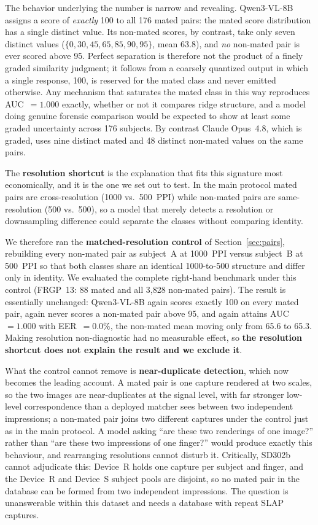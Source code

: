 \documentclass[runningheads]{llncs}
\begin{document}
The behavior underlying the number is narrow and revealing. Qwen3-VL-8B
assigns a score of \emph{exactly} 100 to all 176 mated pairs: the mated
score distribution has a single distinct value. Its non-mated scores, by
contrast, take only seven distinct values
($\{0, 30, 45, 65, 85, 90, 95\}$, mean 63.8), and \emph{no} non-mated pair
is ever scored above 95. Perfect separation is therefore not the product of a finely graded similarity
judgment; it follows from a coarsely quantized output in which a single
response, 100, is reserved for the mated class and never emitted otherwise.
Any mechanism that saturates the mated class in this way reproduces
AUC~$= 1.000$ exactly, whether or not it compares ridge structure, and a model
doing genuine forensic comparison would be expected to show at least some
graded uncertainty across 176 subjects. By contrast Claude Opus~4.8, which is
graded, uses nine distinct mated and 48 distinct non-mated values on the same
pairs.

The \textbf{resolution shortcut} is the explanation that fits this signature
most economically, and it is the one we set out to test. In the main protocol
mated pairs are cross-resolution (1000 vs.\ 500~PPI) while non-mated pairs are
same-resolution (500 vs.\ 500), so a model that merely detects a resolution or
downsampling difference could separate the classes without comparing identity.

We therefore ran the \textbf{matched-resolution control} of
Section~\ref{sec:pairs}, rebuilding every non-mated pair as subject~A at
1000~PPI versus subject~B at 500~PPI so that both classes share an identical
1000-to-500 structure and differ only in identity. We evaluated the complete
right-hand benchmark under this control (FRGP~13: 88 mated and all 3{,}828
non-mated pairs). The result is essentially unchanged: Qwen3-VL-8B again scores
exactly 100 on every mated pair, again never scores a non-mated pair above 95,
and again attains AUC~$= 1.000$ with EER~$= 0.0\%$, the non-mated mean moving
only from 65.6 to 65.3. Making resolution non-diagnostic had no measurable
effect, so \textbf{the resolution shortcut does not explain the result and we
exclude it}.

What the control cannot remove is \textbf{near-duplicate detection}, which now
becomes the leading account. A mated pair is one capture rendered at two
scales, so the two images are near-duplicates at the signal level, with far
stronger low-level correspondence than a deployed matcher sees between two
independent impressions; a non-mated pair joins two different captures under
the control just as in the main protocol. A model asking ``are these two
renderings of one image?'' rather than ``are these two impressions of one
finger?'' would produce exactly this behaviour, and rearranging resolutions
cannot disturb it. Critically, SD302b cannot adjudicate this: Device~R holds
one capture per subject and finger, and the Device~R and Device~S subject
pools are disjoint, so no mated pair in the database can be formed from two
independent impressions. The question is unanswerable within this dataset and
needs a database with repeat SLAP captures.
\end{document}
